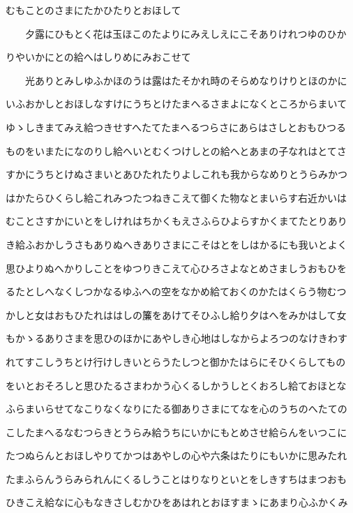 \documentclass[a4paper,11pt,landscape]{ltjtarticle}
\begin{document}
むもことのさまにたかひたりとおほして
\par\medskip
　　夕露にひもとく花は玉ほこのたよりにみえしえにこそありけれつゆのひか
\par\medskip
りやいかにとの給へはしりめにみおこせて
\par\medskip
　　光ありとみしゆふかほのうは露はたそかれ時のそらめなりけりとほのかに
\par\medskip
いふおかしとおほしなすけにうちとけたまへるさまよになくところからまいて
\par\medskip
ゆゝしきまてみえ給つきせすへたてたまへるつらさにあらはさしとおもひつる
\par\medskip
ものをいまたになのりし給へいとむくつけしとの給へとあまの子なれはとてさ
\par\medskip
すかにうちとけぬさまいとあひたれたりよしこれも我からなめりとうらみかつ
\par\medskip
はかたらひくらし給これみつたつねきこえて御くた物なとまいらす右近かいは
\par\medskip
むことさすかにいとをしけれはちかくもえさふらひよらすかくまてたとりあり
\par\medskip
き給ふおかしうさもありぬへきありさまにこそはとをしはかるにも我いとよく
\par\medskip
思ひよりぬへかりしことをゆつりきこえて心ひろさよなとめさましうおもひを
\par\medskip
るたとしへなくしつかなるゆふへの空をなかめ給ておくのかたはくらう物むつ
\par\medskip
かしと女はおもひたれははしの簾をあけてそひふし給り夕はへをみかはして女
\par\medskip
もかゝるありさまを思ひのほかにあやしき心地はしなからよろつのなけきわす
\par\medskip
れてすこしうちとけ行けしきいとらうたしつと御かたはらにそひくらしてもの
\par\medskip
をいとおそろしと思ひたるさまわかう心くるしかうしとくおろし給ておほとな
\par\medskip
ふらまいらせてなこりなくなりにたる御ありさまにてなを心のうちのへたての
\par\medskip
こしたまへるなむつらきとうらみ給うちにいかにもとめさせ給らんをいつこに
\par\medskip
たつぬらんとおほしやりてかつはあやしの心や六条はたりにもいかに思みたれ
\par\medskip
たまふらんうらみられんにくるしうことはりなりといとをしきすちはまつおも
\par\medskip
ひきこえ給なに心もなきさしむかひをあはれとおほすまゝにあまり心ふかくみ
\end{document}
